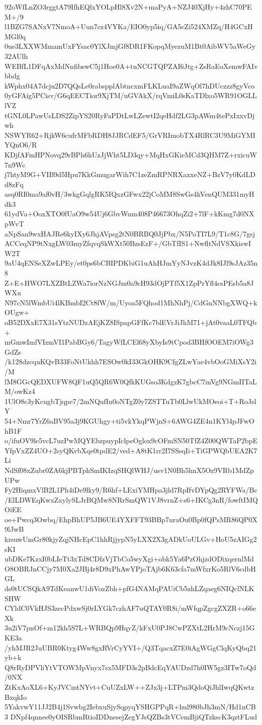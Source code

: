 92oWfLnZO3rggtA79IfhEQlxYOLpHl8Xv2N+maPyA+NZJ40XjHy+4zhC70PEM+/9
l1BZG7SANxV7NmoA+Uun7cz4VYKa/EIO0yp5iq/GA5cZi524XMZq/H4GCxHMGl0q
0ue3LXXWMmamUxFYsac0YlXJmjGf8DR1FKopqMyezuM1Bt0AibWV5aWeGy32AUlh
WEBfL1DFqAxMdNnfibswC5j1Hoe0A+tuNCGTQPZAI6Jtg+ZsRaEoXemwFAIvbbdg
kWphx04A7dcju2D7QQsLe0rabspplAbtncxmFLKLuaI9aZWqOl7hDUczzz8gyVco
0yGFAig5PCisv/G6qEECTior9XjTM/uGVAkX/rqVmiL0sKaTDlxo5WR91OGLLlVZ
tGNL0LPawUsLDS2ZipYS20RyFaPDtLwLZewtI2qeHdf2LG3pAWm4tePxIxxvDjwh
NSWYR62+RjkW6cufrMFbRDH8JJRCdEF5/GrVRImobTX4RlRC3U9MiGYMIYQnO6/R
KDjfAFmHPNovq29rBPh6hUzJjWht5LD3qy+MqHxGKieMCd3QHM7Z+rxicuW7n9Wc
j7htyM9G+VIB9d5Hpu7KkGmugarWih7C1zeZmRPNRXaxxeNZ+BzV7y0KdLDd8zFq
asq0RI0ma9af0vH/3wkgGqlgRK5IQxzGFwx22jCoMM8SwGs4kVenQUM331myHdk3
61ydVa+OoxXTO0fUaO9w54Uj6GbvWum408P46673OhqZi2+7lF+kKmg7d0NXpWvT
aNpSan9wxHAJRe6kyIXy6JhjAVpsg2tN0BRBQ0JjPbx/N5PoTI7L9/T1c8G/7gsj
ACCeqNP9tNxgLW03myZfqvqSkWXt50BzsEzF+/GbTfIS1+NwfltNdVSXkiswIW2T
9aU4qENSeXZwLPEy/et0ps6bCBIPDKbiG1uAhHJmYyNJvzK4dJk8IJl9sJAz35n8
Z+E+HWO7LXZBtLZWa7iorNzNGJm0a9cH93dOjPTf5X1ZpPrYfl4csPEsb5a8JWXu
N97cN5lWmbUi4lKBmbI2Ct8fW/m/Uyoa5FQhod1MhNhPj/CdGnNNbgXWQ+kOUgw+
oB52DXxE7X31sYtzNUDzAEjKZ8ISpapGFfKc7blEVrJiJhM71+jAt0vaaL0TFQb+
mGmwImfVIzmVI1PabBGy6/TagyWfLCEl68yXbyIs9tCpod3BHfOOEM7iOWg3GdZs
/k128dzcquKQvB33FoNtUkhh7ESOw0kI33GkOHK9CfgZLwYae4vbOoGMiXsY2i/M
lM8GGcQEDXUFW8QF1uQ5QR6W0QfkKUGso3KdgzK7gbcC7mVg9NGmIITaLM/owKz4
1UlO8c3yKcugbTjqpe7/2mNQufIn0oNTgZ0y7ZSTTuTb0LlwUkMOeoi+T+RoJslY
54+Nmr7YrZ6aBV95a3j9KGUhgy+ti5vkYkqPWjnS+6AWG4ZE4n1KYl4pJFwOhB1F
o/ifuOV9le5vcL7uzPwMQYEbzpuypIclpeOglox9cOFmSN50TfZ4Z00QWTaP2bpE
YfpVxZZ4UO+2syQKvbXqe0tpdE2/ved+A8tK1rr2I7SSsqIi+TiGPWQbUEA2K7Li
NdSf08xZubr0ZA6kjPBTphSmIKIzqSHQlWHJ/usv1N0Bh5hnX5Oz9VRb1MdZpUPw
Fy2HiqmxVlB2L1Ph4iDe9lky9/R6hf+LExiYMHpa3jld7RpIfvDYpQg2RYFWa/Bc
/ElLDWEqKwxZxylySLJrBQMw8NRrSmQW1VJ8vrnZ+s6+IKCg3nR/fowftIMQOiEE
oe+Pwcq3Owbq/EhpBhUP5JB6UE4YXFFT93BBp7uraOu0Bp0fQPsMR86QP0X9lJwB
krsuwUmGr80kjyZqjNHcEpC1hhRjjypN5yLXX2X3gADkUoULGv+HoU5zAIGg2sKI
ubDKe7KzxI0bLIeTt3xTd8CDfzVjTbCo5wyXgi+obk5Ya6PzOhjzdODixqernlMd
O8OBRJnCCjy7M0Xa2JBj4r8D9xPhAwYPjoTAjb6K63cfa7mWfxrKo5RlV6cdbHGL
ds0tUCSQkA9TdKeanwU1diVozZbh+pfG4NAMqPAUiCb5zhLZqaeg6NIQclNLKSHW
CYldC0VkHJS3zecPdxwSj0rLYGk7czhAF7uQTAY0R8i/mWfqpZgcgZXZR+o66eXk
3u2iV7pnOf+m12kh5S7L+WRBQp9HqyZ/kFxU0PJ8CwPZXtL2HrM9cNczj15GKE3a
/yhMJR2JuUBR0Ktyg4Ww8gxRVrCyYVI+/Q3TqacxZ7E0iAgWGgClqKyQbq21yb+k
Q8rRyDPVliYtVTOWMpVnyx7sx5MFD3s2pBdcEqYAUDzd7h0IW5gz3ITw7oQd/0NX
ZtKxAoXL6+KyJVCmtNYvt+CuUZxLW++ZJx3j+LTPm3QdoQiJhlIwqQKwtzBxqkIo
5YakvwY11JJ2B4j1Svwbg2IebxuSjySqpyqYSHGPPqR+hul980bJh3mN/Hd1nCB3
DNpf4qnnee0yOISRbmRtioIDDnesejZegYJsQZBs3tVCemBjiQTzkscK3qztFLud
